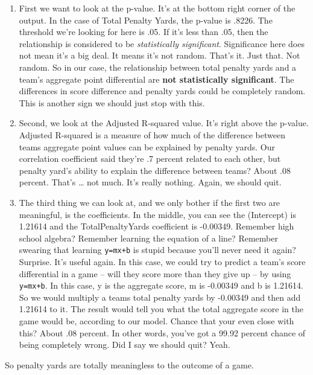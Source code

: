 \documentclass[
  letterpaper,
  DIV=11,
  numbers=noendperiod]{scrreprt}
\providecommand{\tightlist}{%
  \setlength{\itemsep}{0pt}\setlength{\parskip}{0pt}}\usepackage{longtable,booktabs,array}
\begin{document}
\begin{enumerate}
\def\labelenumi{\arabic{enumi}.}
\tightlist
\item
  First we want to look at the p-value. It's at the bottom right corner
  of the output. In the case of Total Penalty Yards, the p-value is
  .8226. The threshold we're looking for here is .05. If it's less than
  .05, then the relationship is considered to be \emph{statistically
  significant}. Significance here does not mean it's a big deal. It
  means it's not random. That's it. Just that. Not random. So in our
  case, the relationship between total penalty yards and a team's
  aggregate point differential are \textbf{not statistically
  significant}. The differences in score difference and penalty yards
  could be completely random. This is another sign we should just stop
  with this.
\item
  Second, we look at the Adjusted R-squared value. It's right above the
  p-value. Adjusted R-squared is a measure of how much of the difference
  between teams aggregate point values can be explained by penalty
  yards. Our correlation coefficient said they're .7 percent related to
  each other, but penalty yard's ability to explain the difference
  between teams? About .08 percent. That's \ldots{} not much. It's
  really nothing. Again, we should quit.
\item
  The third thing we can look at, and we only bother if the first two
  are meaningful, is the coefficients. In the middle, you can see the
  (Intercept) is 1.21614 and the TotalPenaltyYards coefficient is
  -0.00349. Remember high school algebra? Remember learning the equation
  of a line? Remember swearing that learning \texttt{y=mx+b} is stupid
  because you'll never need it again? Surprise. It's useful again. In
  this case, we could try to predict a team's score differential in a
  game -- will they score more than they give up -- by using
  \texttt{y=mx+b}. In this case, y is the aggregate score, m is -0.00349
  and b is 1.21614. So we would multiply a teams total penalty yards by
  -0.00349 and then add 1.21614 to it. The result would tell you what
  the total aggregate score in the game would be, according to our
  model. Chance that your even close with this? About .08 percent. In
  other words, you've got a 99.92 percent chance of being completely
  wrong. Did I say we should quit? Yeah.
\end{enumerate}

So penalty yards are totally meaningless to the outcome of a game.
\end{document}
